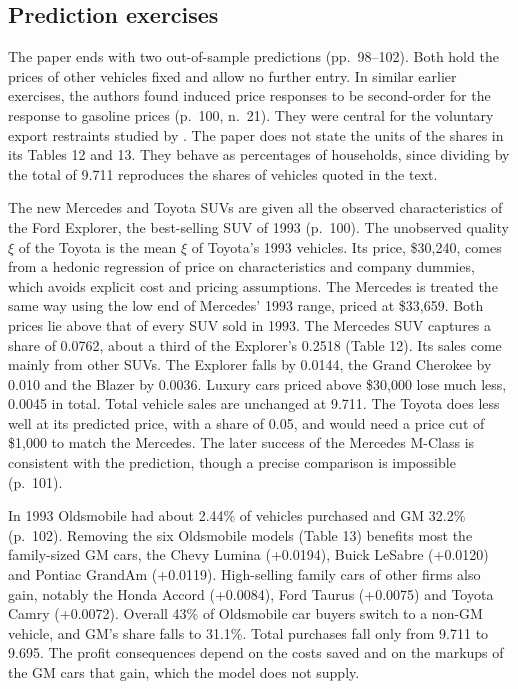 \subsection{Prediction exercises}\label{sec:08-blp04-predictions}

The paper ends with two out-of-sample predictions (pp.~98--102). Both hold the prices of other vehicles fixed
and allow no further entry. In similar earlier exercises, the authors found induced price responses
to be second-order for the response to gasoline prices (p.~100, n.~21). They were central for the voluntary
export restraints studied by \citet{BerryLevinsohnPakes1999}. The paper does not state the units of the
shares in its Tables 12 and 13. They behave as percentages of households, since dividing by the total of
9.711 reproduces the shares of vehicles quoted in the text.

 The new Mercedes and Toyota SUVs are given all the observed characteristics of the Ford
Explorer, the best-selling SUV of 1993 (p.~100). The unobserved quality $\xi$ of the Toyota is the mean $\xi$
of Toyota's 1993 vehicles. Its price, \$30,240, comes from a hedonic regression of price on characteristics and
company dummies, which avoids explicit cost and pricing assumptions. The Mercedes is treated the same way using
the low end of Mercedes' 1993 range, priced at \$33,659. Both prices lie above that of every SUV sold in 1993.
The Mercedes SUV captures a share of 0.0762, about a third of the Explorer's 0.2518 (Table 12). Its sales come
mainly from other SUVs. The Explorer falls by 0.0144, the Grand Cherokee by 0.010 and the Blazer by 0.0036.
Luxury cars priced above \$30,000 lose much less, 0.0045 in total. Total vehicle sales are
unchanged at 9.711. The Toyota does less well at its predicted price, with a share of 0.05, and would need a
price cut of \$1,000 to match the Mercedes. The later success of the Mercedes M-Class is consistent with the
prediction, though a precise comparison is impossible (p.~101).

 In 1993 Oldsmobile had about 2.44\% of vehicles purchased and GM 32.2\%
(p.~102). Removing the six Oldsmobile models (Table 13) benefits most the family-sized GM cars, the Chevy Lumina
(+0.0194), Buick LeSabre (+0.0120) and Pontiac GrandAm (+0.0119). High-selling family cars of other firms also
gain, notably the Honda Accord (+0.0084), Ford Taurus (+0.0075) and Toyota Camry (+0.0072). Overall 43\% of
Oldsmobile car buyers switch to a non-GM vehicle, and GM's share falls to 31.1\%. Total purchases fall only from
9.711 to 9.695. The profit consequences depend on the costs saved and on the markups of the GM cars that gain,
which the model does not supply.


